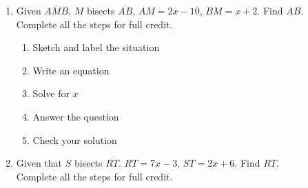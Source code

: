 \documentclass[12pt, twoside]{article}
\begin{document}
\begin{enumerate}
\item Given $\overline{AMB}$, $M$ bisects $\overline{AB}$, $AM=2x-10$, $BM=x+2$. Find ${AB}$.\\
Complete all the steps for full credit. \smallskip
  \begin{enumerate}
    \item Sketch and label the situation
    \item Write an equation
    \item Solve for $x$
    \item Answer the question
    \item Check your solution
  \end{enumerate}

\vspace{4cm}

\item Given that $S$ bisects $\overline{RT}$. $RT=7x-3$, $ST=2x+6$. Find ${RT}$.\\
Complete all the steps for full credit.

\end{enumerate}
\end{document}
